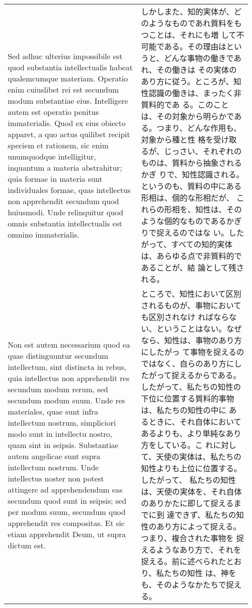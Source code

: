 \documentclass[10pt]{jsarticle} %
\begin{document}
\begin{longtable}{p{21em}p{21em}}
\\



Sed adhuc ulterius impossibile est quod
substantia intellectualis habeat qualemcumque materiam. Operatio enim
cuiuslibet rei est secundum modum substantiae eius. Intelligere autem
est operatio penitus immaterialis. Quod ex eius obiecto apparet, a quo
actus quilibet recipit speciem et rationem, sic enim unumquodque
intelligitur, inquantum a materia abstrahitur; quia formae in materia
sunt individuales formae, quas intellectus non apprehendit secundum quod
huiusmodi. Unde relinquitur quod omnis substantia intellectualis est
omnino immaterialis. 


&

しかしまた、知的実体が、どのようなものであれ質料をもつことは、それにも増
 して不可能である。その理由はというと、どんな事物の働きであれ、その働きは
 その実体のあり方に従う。ところが、知性認識の働きは、まったく非質料的であ
 る。このことは、その対象から明らかである。つまり、どんな作用も、対象から種と性
 格を受け取るが、じっさい、それぞれのものは、質料から抽象されるかぎ
 りで、知性認識される。というのも、質料の中にある形相は、個的な形相だが、
 これらの形相を、知性は、そのような個的なものであるかぎりで捉えるのではな
 い。したがって、すべての知的実体は、あらゆる点で非質料的であることが、結
 論として残される。

\\



Non est autem necessarium quod ea quae
distinguuntur secundum intellectum, sint distincta in rebus, quia
intellectus non apprehendit res secundum modum rerum, sed secundum modum
suum. Unde res materiales, quae sunt infra intellectum nostrum,
simpliciori modo sunt in intellectu nostro, quam sint in
seipsis. Substantiae autem angelicae sunt supra intellectum
nostrum. Unde intellectus noster non potest attingere ad apprehendendum
eas secundum quod sunt in seipsis; sed per modum suum, secundum quod
apprehendit res compositas. Et sic etiam apprehendit Deum, ut supra
dictum est.


&

ところで、知性において区別されるものが、事物においても区別されなけ
 ればならない、ということはない。なぜなら、知性は、事物のあり方にしたがっ
 て事物を捉えるのではなく、自らのあり方にしたがって捉えるからである。
したがって、私たちの知性の下位に位置する質料的事物は、私たちの知性の中に
 あるときに、それ自体においてあるよりも、より単純なあり方をしている。こ
 れに対して、天使の実体は、私たちの知性よりも上位に位置する。したがって、
 私たちの知性は、天使の実体を、それ自体のありかたに即して捉えるまでに到
 達できず、私たちの知性のあり方によって捉える。つまり、複合された事物を
 捉えるようなあり方で、それを捉える。前に述べられたとおり、私たちの知性
 は、神をも、そのようなかたちで捉える。



\end{longtable}
\end{document}
